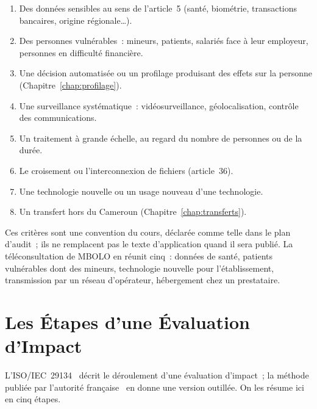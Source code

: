 \begin{enumerate}
    \item Des données sensibles au sens de l'article~5 (santé, biométrie,
          transactions bancaires, origine régionale\ldots).
    \item Des personnes vulnérables~: mineurs, patients, salariés face à
          leur employeur, personnes en difficulté financière.
    \item Une décision automatisée ou un profilage produisant des effets sur
          la personne (Chapitre~\ref{chap:profilage}).
    \item Une surveillance systématique~: vidéosurveillance, géolocalisation,
          contrôle des communications.
    \item Un traitement à grande échelle, au regard du nombre de personnes
          ou de la durée.
    \item Le croisement ou l'interconnexion de fichiers (article~36).
    \item Une technologie nouvelle ou un usage nouveau d'une technologie.
    \item Un transfert hors du Cameroun (Chapitre~\ref{chap:transferts}).
\end{enumerate}

Ces critères sont une convention du cours, déclarée comme telle dans le
plan d'audit~; ils ne remplacent pas le texte d'application quand il sera
publié. La téléconsultation de MBOLO en réunit cinq~: données de santé,
patients vulnérables dont des mineurs, technologie nouvelle pour
l'établissement, transmission par un réseau d'opérateur, hébergement chez
un prestataire.

\section{Les Étapes d'une Évaluation d'Impact}
\label{sec:c05-etapes}

L'ISO/IEC~29134~\cite{iso29134} décrit le déroulement d'une évaluation
d'impact~; la méthode publiée par l'autorité française~\cite{cnil2018pia}
en donne une version outillée. On les résume ici en cinq étapes.

